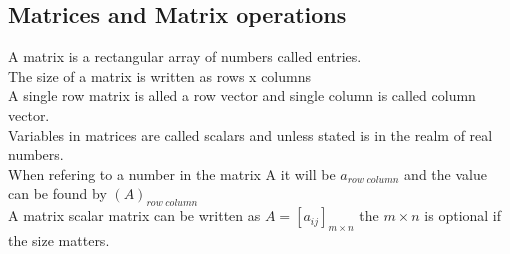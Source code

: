 \documentclass[12pt, a4paper]{article}
\begin{document}
		\subsection{Matrices and Matrix operations}
			A matrix is a rectangular array of numbers called entries.\\
			The size of a matrix is written as rows x columns\\
			A single row matrix is alled a row vector and single column is called column vector.\\
			Variables in matrices are called scalars and unless stated is in the realm of real numbers.\\
			When refering to a number in the matrix A it will be $a_{row\;column}$ and the value can be found by $(A)_{row\;column}$\\
			A matrix scalar matrix can be written as $A=[a_{ij}]_{m\times n}$ the $m\times n$ is optional if the size matters.\\
\end{document}

